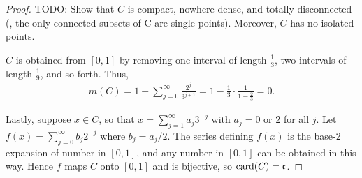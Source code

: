 \begin{proof}
    TODO: Show that $C$ is compact, nowhere dense, and totally disconnected (\ie, the only connected subsets of C are single points). Moreover, $C$ has no isolated points.

    $C$ is obtained from $[0, 1]$ by removing one interval of length $\frac{1}{3}$, two intervals of length $\frac{1}{9}$, and so forth.
    Thus,
    \begin{align}
        m(C) = 1 - \sum_{j=0}^{\infty} \frac{2^j}{3^{j+1}} = 1 - \frac{1}{3} \cdot \frac{1}{1 - \frac{2}{3}} = 0.
    \end{align}

    Lastly, suppose $x \in C$, so that  $x = \sum_{j=1}^{\infty} a_j 3^{-j}$ with $a_j = 0$ or $2$ for all $j$.
    Let $f(x) = \sum_{j=0}^{\infty} b_j 2^{-j}$ where $b_j = a_j/2$.
    The series defining $f(x)$ is the base-2 expansion of number in $[0, 1]$, and any number in $[0, 1]$ can be obtained in this way.
    Hence $f$ maps $C$ onto $[0, 1]$ and is bijective, so $\mathrm{card}(C) = \mathfrak{c}$.
\end{proof}